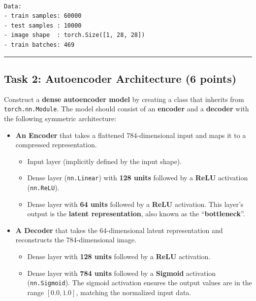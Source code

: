 \documentclass[
  letterpaper,
  DIV=11,
  numbers=noendperiod]{scrartcl}
\providecommand{\tightlist}{%
  \setlength{\itemsep}{0pt}\setlength{\parskip}{0pt}}\usepackage{longtable,booktabs,array}
\begin{document}
\label{task1}
\begin{verbatim}

Data:
- train samples: 60000
- test samples : 10000
- image shape  : torch.Size([1, 28, 28])
- train batches: 469
\end{verbatim}

\begin{center}\rule{0.5\linewidth}{0.5pt}\end{center}

\subsection{Task 2: Autoencoder Architecture (6
points)}\label{task-2-autoencoder-architecture-6-points}

Construct a \textbf{dense autoencoder model} by creating a class that
inherits from \texttt{torch.nn.Module}. The model should consist of an
\textbf{encoder} and a \textbf{decoder} with the following symmetric
architecture:

\begin{itemize}
\item
  \textbf{An Encoder} that takes a flattened 784-dimensional input and
  maps it to a compressed representation.

  \begin{itemize}
  \tightlist
  \item
    Input layer (implicitly defined by the input shape).
  \item
    Dense layer (\texttt{nn.Linear}) with \textbf{128 units} followed by
    a \textbf{ReLU} activation (\texttt{nn.ReLU}).
  \item
    Dense layer with \textbf{64 units} followed by a \textbf{ReLU}
    activation. This layer's output is the \textbf{latent
    representation}, also known as the ``\textbf{bottleneck}''.
  \end{itemize}
\item
  \textbf{A Decoder} that takes the 64-dimensional latent representation
  and reconstructs the 784-dimensional image.

  \begin{itemize}
  \tightlist
  \item
    Dense layer with \textbf{128 units} followed by a \textbf{ReLU}
    activation.
  \item
    Dense layer with \textbf{784 units} followed by a \textbf{Sigmoid}
    activation (\texttt{nn.Sigmoid}). The sigmoid activation ensures the
    output values are in the range \([0.0, 1.0]\), matching the
    normalized input data.
  \end{itemize}
\end{itemize}
\end{document}
